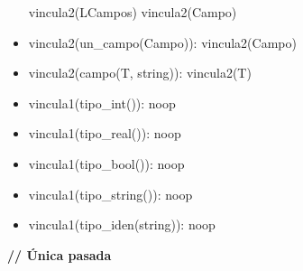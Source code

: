 \documentclass[11pt]{article}
\begin{document}
\begin{itemize}
                    \subitem vincula2(LCampos) 
                    \subitem vincula2(Campo)
                \item vincula2(un\_campo(Campo)): 
                    \subitem vincula2(Campo)
                \item vincula2(campo(T, string)): 
                    \subitem vincula2(T)
                \item vincula1(tipo\_int()): 
                    \subitem noop 
                \item vincula1(tipo\_real()): 
                    \subitem noop
                \item vincula1(tipo\_bool()): 
                    \subitem noop
                \item vincula1(tipo\_string()): 
                    \subitem noop
                \item vincula1(tipo\_iden(string)): 
                    \subitem noop
            \end{itemize}
            \textbf{\/// Única pasada}
\end{document}
